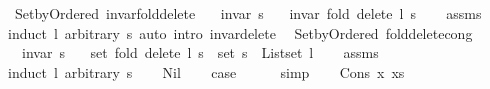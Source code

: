 \begin{isabellebody}
%
\isadeliminvisible
\isanewline
%
\endisadeliminvisible
%
\isataginvisible
{}\isamarkupfalse%
\ {\isacharparenleft}{\kern0pt}\ Set{\isacharunderscore}{\kern0pt}by{\isacharunderscore}{\kern0pt}Ordered{\isacharparenright}{\kern0pt}\ invar{\isacharunderscore}{\kern0pt}fold{\isacharunderscore}{\kern0pt}delete{\isacharcolon}{\kern0pt}\isanewline
\ \ \ {\isachardoublequoteopen}invar\ s{\isachardoublequoteclose}\isanewline
\ \ \ {\isachardoublequoteopen}invar\ {\isacharparenleft}{\kern0pt}fold\ delete\ l\ s{\isacharparenright}{\kern0pt}{\isachardoublequoteclose}%
\endisataginvisible
{\isafoldinvisible}%
%
\isadeliminvisible
\isanewline
%
\endisadeliminvisible
%
\isadelimproof
\ \ %
\endisadelimproof
%
\isatagproof
{}\isamarkupfalse%
\ assms\isanewline
\ \ \isamarkupfalse%
\ {\isacharparenleft}{\kern0pt}induct\ l\ arbitrary{\isacharcolon}{\kern0pt}\ s{\isacharparenright}{\kern0pt}\ {\isacharparenleft}{\kern0pt}auto\ intro{\isacharcolon}{\kern0pt}\ invar{\isacharunderscore}{\kern0pt}delete{\isacharparenright}{\kern0pt}%
\endisatagproof
{\isafoldproof}%
%
\isadelimproof
\isanewline
%
\endisadelimproof
%
\isadeliminvisible
\isanewline
%
\endisadeliminvisible
%
\isataginvisible
{}\isamarkupfalse%
\ {\isacharparenleft}{\kern0pt}\ Set{\isacharunderscore}{\kern0pt}by{\isacharunderscore}{\kern0pt}Ordered{\isacharparenright}{\kern0pt}\ fold{\isacharunderscore}{\kern0pt}delete{\isacharunderscore}{\kern0pt}cong{\isacharcolon}{\kern0pt}\isanewline
\ \ \ {\isachardoublequoteopen}invar\ s{\isachardoublequoteclose}\isanewline
\ \ \ {\isachardoublequoteopen}set\ {\isacharparenleft}{\kern0pt}fold\ delete\ l\ s{\isacharparenright}{\kern0pt}\ {\isacharequal}{\kern0pt}\ set\ s\ {\isacharminus}{\kern0pt}\ List{\isachardot}{\kern0pt}set\ l{\isachardoublequoteclose}%
\endisataginvisible
{\isafoldinvisible}%
%
\isadeliminvisible
\isanewline
%
\endisadeliminvisible
%
\isadelimproof
\ \ %
\endisadelimproof
%
\isatagproof
{}\isamarkupfalse%
\ assms\isanewline
{}\isamarkupfalse%
\ {\isacharparenleft}{\kern0pt}induct\ l\ arbitrary{\isacharcolon}{\kern0pt}\ s{\isacharparenright}{\kern0pt}\isanewline
\ \ \isamarkupfalse%
\ Nil\isanewline
\ \ \isamarkupfalse%
\ {\isacharquery}{\kern0pt}case\isanewline
\ \ \ \ \isamarkupfalse%
\ simp\isanewline
{}\isamarkupfalse%
\isanewline
\ \ \isamarkupfalse%
\ {\isacharparenleft}{\kern0pt}Cons\ x\ xs{\isacharparenright}{\kern0pt}\isanewline

\end{isabellebody}
